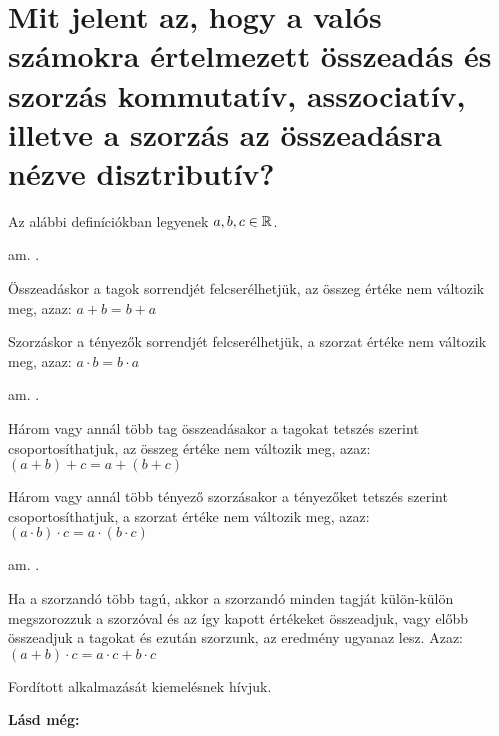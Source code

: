 
\section{Mit jelent az, hogy a valós számokra értelmezett összeadás és szorzás
kommutatív, asszociatív, illetve a szorzás az összeadásra nézve disztributív?}
\label{004}

Az alábbi definíciókban legyenek $a, b, c \in \mathbb{R}$.

\begin{defin}[Kommutativitás]
\label{def:commutat}
am. .

Összeadáskor a tagok sorrendjét felcserélhetjük, az összeg értéke nem változik
meg, azaz: $a + b = b + a$

Szorzáskor a tényezők sorrendjét felcserélhetjük, a szorzat értéke nem változik
meg, azaz: $a \cdot b = b \cdot a$
\end{defin}

\begin{defin}[Asszociativitás]
\label{def:assoc}
am. .

Három vagy annál több tag összeadásakor a tagokat tetszés szerint
csoportosíthatjuk, az összeg értéke nem változik meg, azaz:
$(a + b) + c = a + (b + c)$

Három vagy annál több tényező szorzásakor a tényezőket tetszés szerint
csoportosíthatjuk, a szorzat értéke nem változik meg, azaz:
$(a \cdot b) \cdot c = a \cdot (b \cdot c)$
\end{defin}

\begin{defin}[Disztributivitás]
am. .

Ha a szorzandó több tagú, akkor a szorzandó minden tagját külön-külön
megszorozzuk a szorzóval és az így kapott értékeket összeadjuk, vagy előbb
összeadjuk a tagokat és ezután szorzunk, az eredmény ugyanaz lesz. Azaz:
$(a + b) \cdot c = a \cdot c + b \cdot c$

Fordított alkalmazását kiemelésnek hívjuk.
\end{defin}

\textbf{Lásd még:}
